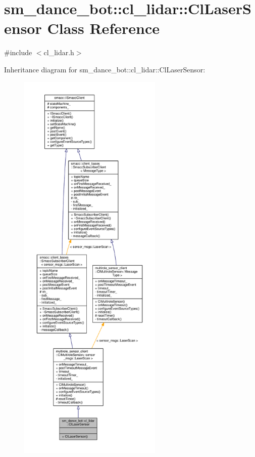 \hypertarget{classsm__dance__bot_1_1cl__lidar_1_1ClLaserSensor}{}\section{sm\+\_\+dance\+\_\+bot\+:\+:cl\+\_\+lidar\+:\+:Cl\+Laser\+Sensor Class Reference}
\label{classsm__dance__bot_1_1cl__lidar_1_1ClLaserSensor}


{\ttfamily \#include $<$cl\+\_\+lidar.\+h$>$}



Inheritance diagram for sm\+\_\+dance\+\_\+bot\+:\+:cl\+\_\+lidar\+:\+:Cl\+Laser\+Sensor\+:\nopagebreak
\begin{figure}[H]
\begin{center}
\leavevmode
\includegraphics[height=550pt]{classsm__dance__bot_1_1cl__lidar_1_1ClLaserSensor__inherit__graph}
\end{center}
\end{figure}



